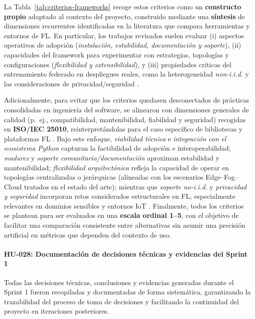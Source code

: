 \documentclass{report}
\begin{document}
La Tabla~\ref{tab:criterios-frameworks} recoge estos criterios como un \textbf{constructo propio} adaptado al contexto del proyecto, construido mediante una \textbf{síntesis} de dimensiones recurrentes identificadas en la literatura que compara herramientas y entornos de FL. En particular, los trabajos revisados suelen evaluar (i) aspectos operativos de adopción (\textit{instalación, estabilidad, documentación y soporte}), (ii) capacidades del framework para experimentar con estrategias, topologías y configuraciones (\textit{flexibilidad y extensibilidad}), y (iii) propiedades críticas del entrenamiento federado en despliegues reales, como la heterogeneidad \textit{non-i.i.d.} y las consideraciones de privacidad/seguridad \cite{Riedel2024Frameworks,Boekhoff2025Comparison,Elshair2024Simulators,FedEvalSurvey2023,NonIIDReview2024}. 

Adicionalmente, para evitar que los criterios quedasen desconectados de prácticas consolidadas en ingeniería del software, se alinearon con dimensiones generales de calidad (p.\ ej., compatibilidad, mantenibilidad, fiabilidad y seguridad) recogidas en \textbf{ISO/IEC 25010}, reinterpretándolas para el caso específico de bibliotecas y plataformas FL \cite{ISO25010}. Bajo este enfoque, \emph{viabilidad técnica} e \emph{integración con el ecosistema Python} capturan la factibilidad de adopción e interoperabilidad; \emph{madurez} y \emph{soporte comunitario/documentación} aproximan estabilidad y mantenibilidad; \emph{flexibilidad arquitectónica} refleja la capacidad de operar en topologías centralizadas o jerárquicas (alineadas con los escenarios Edge--Fog--Cloud tratados en el estado del arte); mientras que \emph{soporte no-i.i.d.} y \emph{privacidad y seguridad} incorporan retos considerados estructurales en FL, especialmente relevantes en dominios sensibles y entornos IoT \cite{kairouz2021advances,li2020federated}. Finalmente, todos los criterios se plantean para ser evaluados en una \textbf{escala ordinal 1--5}, con el objetivo de facilitar una comparación consistente entre alternativas sin asumir una precisión artificial en métricas que dependen del contexto de uso.


\paragraph{HU-028: Documentación de decisiones técnicas y evidencias del Sprint 1}
Todas las decisiones técnicas, conclusiones y evidencias generadas durante el Sprint 1 fueron recopiladas y documentadas de forma sistemática, garantizando la trazabilidad del proceso de toma de decisiones y facilitando la continuidad del proyecto en iteraciones posteriores.
\end{document}
